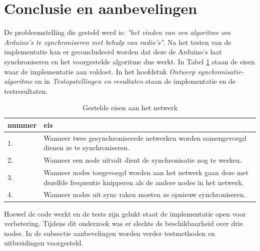 \documentclass{article}
\begin{document}
\section{Conclusie en aanbevelingen}
De probleemstelling die gesteld werd is: \textit{"het vinden van een algoritme om Arduino's te synchroniseren met behulp van radio's"}. Na het testen van de implementatie kan er geconcludeerd worden dat deze de Arduino's laat synchroniseren en het voorgestelde algoritme dus werkt. In Tabel \ref{tab: Gestelde eisen} staan de eisen waar de implementatie aan voldoet. In het hoofdstuk \textit{Ontwerp synchronisatie-algoritme} en in \textit{Testopstellingen en resultaten} staan de implementatie en de testresultaten. 
\begin{table}[h]
	\centering\caption{Gestelde eisen aan het netwerk}
	\label{tab: Gestelde eisen}
	\begin{tabular}{|l|p{10cm}|}\hline
	\textbf{nummer} & \textbf{eis} \\ \hline
	1. & Wanneer twee gesynchroniseerde netwerken worden samengevoegd 
	dienen ze te synchroniseren. \\ \hline
	2. & Wanneer een node uitvalt dient de synchronisatie 
	nog te werken. \\ \hline
	3. & Wanneer nodes toegevoegd worden aan het netwerk gaan deze met dezelfde
	 frequentie knipperen als de andere nodes in het netwerk.\\ \hline
	4. & Wanneer nodes uit sync raken moeten ze opnieuw synchroniseren. \\ \hline
	\end{tabular}
\end{table}
\newline
Hoewel de code werkt en de tests zijn gelukt staat de implementatie open voor verbetering. Tijdens dit onderzoek was er slechts de beschikbaarheid over drie nodes. In de subsectie aanbevelingen worden verder testmethoden en uitbreidingen voorgesteld. 
\end{document}
